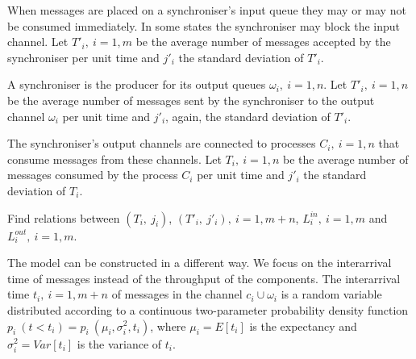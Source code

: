 When messages are placed on a synchroniser's input queue they may or may not be consumed immediately. In some states the synchroniser may block the input channel. Let $T'_{i}, \: i=1,m$ be the average number of messages accepted by the synchroniser per unit time and $j'_{i}$ the standard deviation of $T'_{i}$.

A synchroniser is the producer for its output queues $\omega_{i}, \: i=1,n$. Let $T'_{i}, \: i=1,n$ be the average number of messages sent by the synchroniser to the output channel $\omega_{i}$ per unit time and $j'_{i}$, again, the standard deviation of $T'_{i}$.

The synchroniser's output channels are connected to processes $C_{i}, \: i=1,n$ that consume messages from these channels. Let $T_{i}, \: i=1,n$ be the average number of messages consumed by the process $C_{i}$ per unit time and $j'_{i}$ the standard deviation of $T_{i}$.

\begin{problem}Find relations between $(T_{i}, \: j_{i})$, $(T'_{i}, \: j'_{i}), \: i=1,m+n$, $L^{in}_{i}, \: i=1,m$ and $L^{out}_{i}, \: i=1,m$.
\end{problem}

The model can be constructed in a different way. We focus on the interarrival time of messages instead of the throughput of the components. The interarrival time $t_{i}, \: i=1,m+n$ of messages in the channel $c_{i} \cup \omega_{i}$ is a random variable distributed according to a continuous two-parameter probability density function $p_{i} \: (t < t_{i}) = p_{i} \: (\mu_{i}, \sigma^2_{i}, t_{i})$, where $\mu_{i} = E[t_{i}]$ is the expectancy and $\sigma^2_{i} = Var[t_{i}]$ is the variance of $t_{i}$.


